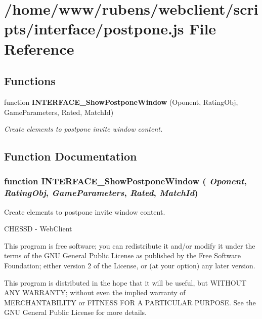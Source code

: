 \section{/home/www/rubens/webclient/scripts/interface/postpone.js File Reference}
\label{postpone_8js}
\subsection*{Functions}
\begin{CompactItemize}
\item 
function {\bf INTERFACE\_\-ShowPostponeWindow} (Oponent, RatingObj, GameParameters, Rated, MatchId)
\begin{CompactList}\small\item\em Create elements to postpone invite window content. \item\end{CompactList}\end{CompactItemize}


\subsection{Function Documentation}
\subsubsection[INTERFACE\_\-ShowPostponeWindow]{\setlength{\rightskip}{0pt plus 5cm}function INTERFACE\_\-ShowPostponeWindow ( {\em Oponent}, \/   {\em RatingObj}, \/   {\em GameParameters}, \/   {\em Rated}, \/   {\em MatchId})}\label{postpone_8js_f90ece6734e084a6263a046b7a350939}


Create elements to postpone invite window content. 

CHESSD - WebClient

This program is free software; you can redistribute it and/or modify it under the terms of the GNU General Public License as published by the Free Software Foundation; either version 2 of the License, or (at your option) any later version.

This program is distributed in the hope that it will be useful, but WITHOUT ANY WARRANTY; without even the implied warranty of MERCHANTABILITY or FITNESS FOR A PARTICULAR PURPOSE. See the GNU General Public License for more details.

